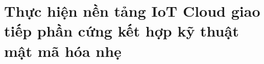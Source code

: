 \chapter{Thực hiện nền tảng IoT Cloud giao tiếp phần cứng kết hợp kỹ thuật mật mã hóa nhẹ}
\label{Chapter3}

